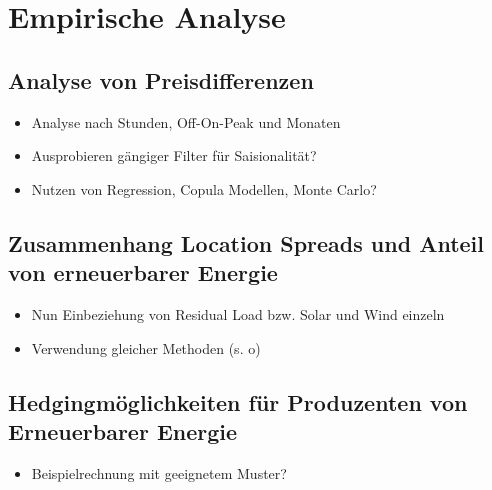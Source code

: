 \section{Empirische Analyse}
\label{sec:Empirische Analyse}

\subsection{Analyse von Preisdifferenzen}
\label{sec:Analyse von Preisdifferenzen}
\begin{itemize}
    \item Analyse nach Stunden, Off-On-Peak und Monaten 
    \item Ausprobieren gängiger Filter für Saisionalität? 
    \item Nutzen von Regression, Copula Modellen, Monte Carlo? 
\end{itemize}

\subsection{Zusammenhang Location Spreads und Anteil von erneuerbarer Energie}
\label{sec:Zusammenhang Location Spreads und Anteil von erneuerbarer Energie}
\begin{itemize}
    \item Nun Einbeziehung von Residual Load bzw. Solar und Wind einzeln
    \item Verwendung gleicher Methoden (s. o)
\end{itemize}

\subsection{Hedgingmöglichkeiten für Produzenten von Erneuerbarer Energie}
\label{sec:Hedgingmöglichkeiten für Produzenten von Erneuerbarer Energie}
\begin{itemize}
    \item Beispielrechnung mit geeignetem Muster? 
\end{itemize}
